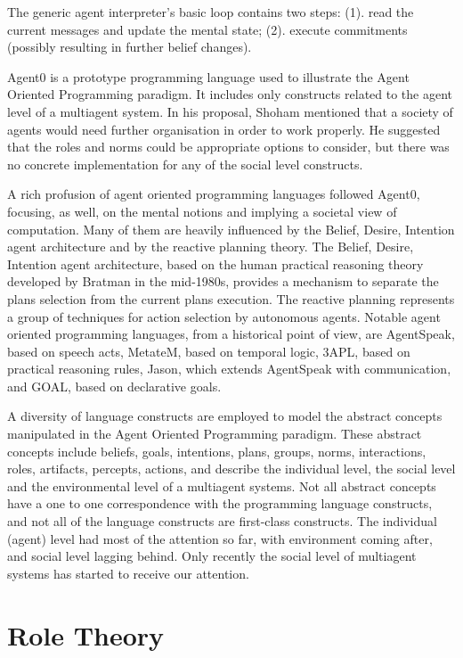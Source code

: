 \documentclass[a4paper,12pt,oneside,fleqn]{book} %
\theoremstyle{plain}
\theoremstyle{definition}
\theoremstyle{remark}
\begin{document}
The generic agent interpreter's basic loop contains two steps: (1). read
the current messages and update the mental state; (2). execute commitments
(possibly resulting in further belief changes).

Agent0 is a prototype programming language used to illustrate the Agent
Oriented Programming paradigm. It includes only constructs related to the
agent level of a multiagent system. In his proposal, Shoham mentioned that
a society of agents would need further organisation in order to work
properly. He suggested that the roles and norms could be appropriate
options to consider, but there was no concrete implementation for any of
the social level constructs.

A rich profusion of agent oriented programming languages followed Agent0,
focusing, as well, on the mental notions and implying a societal view of
computation.  Many of them are heavily influenced by the Belief, Desire,
Intention agent architecture and by the reactive planning theory.  The
Belief, Desire, Intention agent architecture, based on the human practical
reasoning theory developed by Bratman in the mid-1980s, provides a
mechanism to separate the plans selection from the current plans execution.
The reactive planning represents a group of techniques for action selection
by autonomous agents.  Notable agent oriented programming languages, from a
historical point of view, are AgentSpeak, based on speech acts, MetateM,
based on temporal logic, 3APL, based on practical reasoning rules, Jason,
which extends AgentSpeak with communication, and GOAL, based on declarative
goals.

A diversity of language constructs are employed to model the abstract
concepts manipulated in the Agent Oriented Programming paradigm. These
abstract concepts include beliefs, goals, intentions, plans, groups, norms,
interactions, roles, artifacts, percepts, actions, and describe the
individual level, the social level and the environmental level of a
multiagent systems. Not all abstract concepts have a one to one
correspondence with the programming language constructs, and not all of the
language constructs are first-class constructs. The individual (agent) level
had most of the attention so far, with environment coming after, and social
level lagging behind. Only recently the social level of multiagent systems
has started to receive our attention.

\section{Role Theory} %
\end{document}
